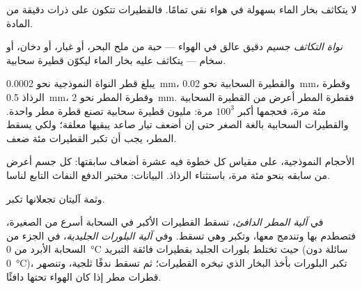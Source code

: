 لا يتكاثف بخار الماء بسهولة في هواء نقي تمامًا. فالقطيرات تتكون على ذرات دقيقة من
المادة.

\begin{definition}\label{def:g10:why-clouds-form:nucleus}
\emph{نواة التكاثف} جسيم دقيق عالق في الهواء --- حبة من ملح
البحر، أو غبار، أو دخان، أو سخام --- يتكاثف عليه بخار الماء ليكوّن قطيرة
سحابية.
\end{definition}

يبلغ قطر النواة النموذجية نحو \qty{0.0002}{mm}، والقطيرة السحابية نحو
\qty{0.02}{mm}، وقطرة الرذاذ \qty{0.5}{mm}، وقطرة المطر نحو
\qty{2}{mm}. فقطرة المطر أعرض من القطيرة السحابية مئة مرة، فحجمها أكبر
$100^3$ مرة: مليون قطيرة سحابية تصنع قطرة مطر واحدة. والقطيرات السحابية بالغة
الصغر حتى إن أضعف تيار صاعد يبقيها معلقة؛ ولكي يسقط المطر، يجب أن تكبر القطيرات
مئة ضعف.

\begin{omfigure}

{\small الأحجام النموذجية، على مقياس كل خطوة فيه عشرة أضعاف سابقتها: كل جسم أعرض
من سابقه بنحو مئة مرة، باستثناء الرذاذ. البيانات: مختبر الدفع النفاث التابع
لناسا.}
\end{omfigure}

وثمة آليتان تجعلانها تكبر.

\begin{definition}\label{def:g10:why-clouds-form:rain-processes}
في \emph{آلية المطر الدافئ}، تسقط القطيرات الأكبر في
السحابة أسرع من الصغيرة، فتصطدم بها وتندمج معها، وتكبر وهي تسقط. وفي
\emph{آلية البلورات
الجليدية}، في الجزء من السحابة الأبرد من
\qty{0}{\degreeCelsius} حيث تختلط بلورات الجليد بقطيرات فائقة التبريد (سائلة
دون \qty{0}{\degreeCelsius})، تكبر البلورات بأخذ البخار الذي تبخره القطيرات؛ ثم
تسقط ندفًا ثلجية، وتنصهر قطرات مطر إذا كان الهواء تحتها دافئًا.
\end{definition}

